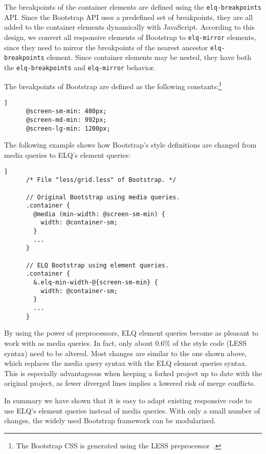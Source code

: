 \documentclass[sigplan,9pt]{acmart}
\newcommand{\elq}{ELQ}
\newcommand{\code}[1]{\texttt{#1}}
\begin{document}
    The breakpoints of the container elements are defined using the \code{elq-breakpoints} API.
    Since the Bootstrap API uses a predefined set of breakpoints, they are all added to the container elements dynamically with JavaScript.
    According to this design, we convert all responsive elements of Bootstrap to \code{elq-mirror} elements, since they need to mirror the breakpoints of the nearest ancestor \code{elq-breakpoints} element.
    Since container elements may be nested, they have both the \code{elq-breakpoints} and \code{elq-mirror} behavior.

    The breakpoints of Bootstrap are defined as the following constants:\footnote{The Bootstrap CSS is generated using the LESS preprocessor~\cite{lesscss}.}
    \begin{lstlisting}[gobble=6,label={code:bootstrap-less-breakpoints},caption={},captionpos=b]]
      @screen-sm-min: 480px;
      @screen-md-min: 992px;
      @screen-lg-min: 1200px;
    \end{lstlisting}

    The following example shows how Bootstrap's style definitions are changed from media queries to \elq{}'s element queries:
    \begin{lstlisting}[gobble=6,label={code:bootstrap-less-breakpoints-usage},caption={},captionpos=b]]
      /* File "less/grid.less" of Bootstrap. */

      // Original Bootstrap using media queries.
      .container {
        @media (min-width: @screen-sm-min) {
          width: @container-sm;
        }
        ...
      }

      // ELQ Bootstrap using element queries.
      .container {
        &.elq-min-width-@{screen-sm-min} {
          width: @container-sm;
        }
        ...
      }
    \end{lstlisting}

    By using the power of preprocessors, \elq{} element queries become as pleasant to work with as media queries.
    In fact, only about 0.6\% of the style code (LESS syntax) need to be altered.
    Most changes are similar to the one shown above, which replaces the media query syntax with the \elq{} element queries syntax.
    This is especially advantageous when keeping a forked project up to date with the original project, as fewer diverged lines implies a lowered risk of merge conflicts.

    In summary we have shown that it is easy to adapt existing responsive code to use \elq{}'s element queries instead of media queries.
    With only a small number of changes, the widely used Bootstrap framework can be modularized.
\end{document}
